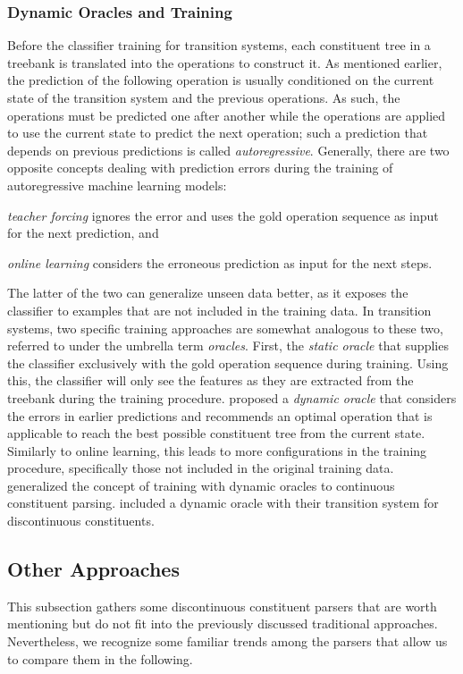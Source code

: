 \documentclass[../document.tex]{subfiles}
\begin{document}
    \subsubsection*{Dynamic Oracles and Training}
    Before the classifier training for transition systems, each constituent tree in a treebank is translated into the operations to construct it.
    As mentioned earlier, the prediction of the following operation is usually conditioned on the current state of the transition system and the previous operations.
    As such, the operations must be predicted one after another while the operations are applied to use the current state to predict the next operation; such a prediction that depends on previous predictions is called \emph{autoregressive}.
    Generally, there are two opposite concepts dealing with prediction errors during the training of autoregressive machine learning models:
    \begin{compactitem}
        \item \emph{teacher forcing} ignores the error and uses the gold operation sequence as input for the next prediction, and
        \item \emph{online learning} considers the erroneous prediction as input for the next steps.
    \end{compactitem}
    The latter of the two can generalize unseen data better, as it exposes the classifier to examples that are not included in the training data.
    In transition systems, two specific training approaches are somewhat analogous to these two, referred to under the umbrella term \emph{oracles}.
    First, the \emph{static oracle} that supplies the classifier exclusively with the gold operation sequence during training.
    Using this, the classifier will only see the features as they are extracted from the treebank during the training procedure.
    \cite{Goldberg12} proposed a \emph{dynamic oracle} that considers the errors in earlier predictions and recommends an optimal operation that is applicable to reach the best possible constituent tree from the current state.
    Similarly to online learning, this leads to more configurations in the training procedure, specifically those not included in the original training data.
    \citet{Coavoux16,Cross16} generalized the concept of training with dynamic oracles to continuous constituent parsing.
    \citet{CoaCoh19} included a dynamic oracle with their transition system for discontinuous constituents.
    
    \subsection{Other Approaches}\label{sec:literature:others}
    This subsection gathers some discontinuous constituent parsers that are worth mentioning but do not fit into the previously discussed traditional approaches.
    Nevertheless, we recognize some familiar trends among the parsers that allow us to compare them in the following.
\end{document}
